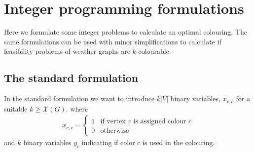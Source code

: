 \section{Integer programming formulations}
Here we formulate some integer problems to calculate an optimal colouring. The same formulations can be used with minor simplifications to calculate if feasibility problems of weather graphs are $k$-colourable.
\subsection{The standard formulation}
In the standard formulation we want to introduce $k|V|$ binary variables, $x_{v,c}$ for a suitable $k\geq \mathcal{X}(G)$. where
\begin{align} \label{x standard}
x_{v,c} = \left\{
\begin{array}{ll}
1 & \text{if vertex }v \text{ is assigned colour } c \\ 0 & \text{otherwise}
\end{array}\right.
\end{align}
and $k$ binary variables $y_c$ indicating if color $c$ is used in the colouring.\\
